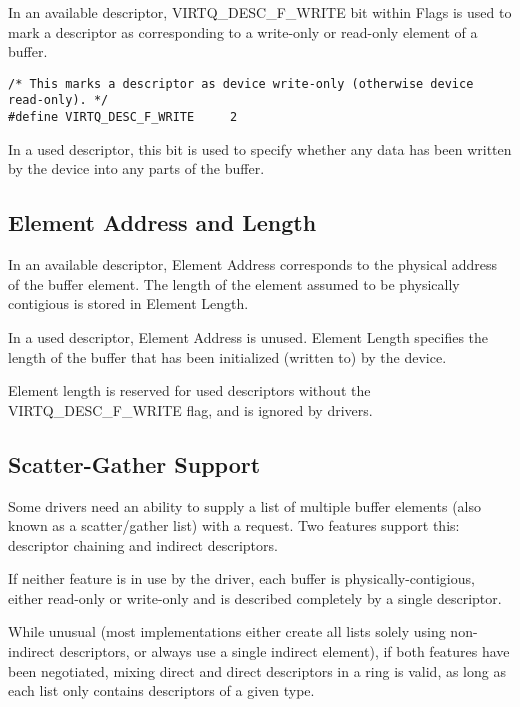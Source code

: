 In an available descriptor, VIRTQ_DESC_F_WRITE bit within Flags
is used to mark a descriptor as corresponding to a write-only or
read-only element of a buffer.

\begin{lstlisting}
/* This marks a descriptor as device write-only (otherwise device read-only). */
#define VIRTQ_DESC_F_WRITE     2
\end{lstlisting}

In a used descriptor, this bit is used to specify whether any
data has been written by the device into any parts of the buffer.


\subsection{Element Address and Length}
\label{sec:Packed Virtqueues / Element Address and Length}

In an available descriptor, Element Address corresponds to the
physical address of the buffer element. The length of the element assumed
to be physically contigious is stored in Element Length.

In a used descriptor, Element Address is unused. Element Length
specifies the length of the buffer that has been initialized
(written to) by the device.

Element length is reserved for used descriptors without the
VIRTQ_DESC_F_WRITE flag, and is ignored by drivers.

\subsection{Scatter-Gather Support}
\label{sec:Packed Virtqueues / Scatter-Gather Support}

Some drivers need an ability to supply a list of multiple buffer
elements (also known as a scatter/gather list) with a request.
Two features support this: descriptor chaining and indirect descriptors.

If neither feature is in use by the driver, each buffer is
physically-contigious, either read-only or write-only and is
described completely by a single descriptor.

While unusual (most implementations either create all lists
solely using non-indirect descriptors, or always use a single
indirect element), if both features have been negotiated, mixing
direct and direct descriptors in a ring is valid, as long as each
list only contains descriptors of a given type.

